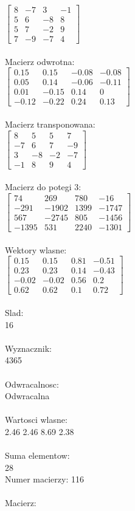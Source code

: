 \documentclass[a4paper,12pt]{article}
\begin{document}
$\begin{bmatrix} 8&-7&3&-1\\5&6&-8&8\\5&7&-2&9\\7&-9&-7&4 \end{bmatrix}$
\\
\\
Macierz odwrotna:\\

$\begin{bmatrix} 0.15&0.15&-0.08&-0.08\\0.05&0.14&-0.06&-0.11\\0.01&-0.15&0.14&0\\-0.12&-0.22&0.24&0.13 \end{bmatrix}$
\\
\\
Macierz transponowana:\\

$\begin{bmatrix} 8&5&5&7\\-7&6&7&-9\\3&-8&-2&-7\\-1&8&9&4 \end{bmatrix}$
\\
\\
Macierz do potegi 3:\\

$\begin{bmatrix} 74&269&780&-16\\-291&-1902&1399&-1747\\567&-2745&805&-1456\\-1395&531&2240&-1301 \end{bmatrix}$
\\
\\
Wektory wlasne:\\

$\begin{bmatrix} 0.15&0.15&0.81&-0.51\\0.23&0.23&0.14&-0.43\\-0.02&-0.02&0.56&0.2\\0.62&0.62&0.1&0.72 \end{bmatrix}$
\\
\\
Slad:\\
16
\\
\\
Wyznacznik:\\
4365
\\
\\
Odwracalnosc:\\
Odwracalna
\\
\\
Wartosci wlasne:\\
2.46 2.46 8.69 2.38
\\
\\
Suma elementow:\\
28
\\
\newpage
Numer macierzy:
116
\\
\\
Macierz:\\
\end{document}
